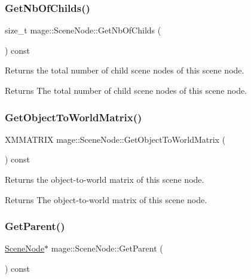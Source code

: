 \subsubsection{\texorpdfstring{Get\+Nb\+Of\+Childs()}{GetNbOfChilds()}}
{\footnotesize\ttfamily size\+\_\+t mage\+::\+Scene\+Node\+::\+Get\+Nb\+Of\+Childs (\begin{DoxyParamCaption}{ }\end{DoxyParamCaption}) const}

Returns the total number of child scene nodes of this scene node.

\begin{DoxyReturn}{Returns}
The total number of child scene nodes of this scene node. 
\end{DoxyReturn}
\hypertarget{classmage_1_1_scene_node_a4325660d42f5f393c77389a44aedb5cb}{}\label{classmage_1_1_scene_node_a4325660d42f5f393c77389a44aedb5cb} 
\subsubsection{\texorpdfstring{Get\+Object\+To\+World\+Matrix()}{GetObjectToWorldMatrix()}}
{\footnotesize\ttfamily X\+M\+M\+A\+T\+R\+IX mage\+::\+Scene\+Node\+::\+Get\+Object\+To\+World\+Matrix (\begin{DoxyParamCaption}{ }\end{DoxyParamCaption}) const}

Returns the object-\/to-\/world matrix of this scene node.

\begin{DoxyReturn}{Returns}
The object-\/to-\/world matrix of this scene node. 
\end{DoxyReturn}
\hypertarget{classmage_1_1_scene_node_a512a9d0f935abf304980312680be3f30}{}\label{classmage_1_1_scene_node_a512a9d0f935abf304980312680be3f30} 
\subsubsection{\texorpdfstring{Get\+Parent()}{GetParent()}}
{\footnotesize\ttfamily \hyperlink{classmage_1_1_scene_node}{Scene\+Node}$\ast$ mage\+::\+Scene\+Node\+::\+Get\+Parent (\begin{DoxyParamCaption}{ }\end{DoxyParamCaption}) const}

